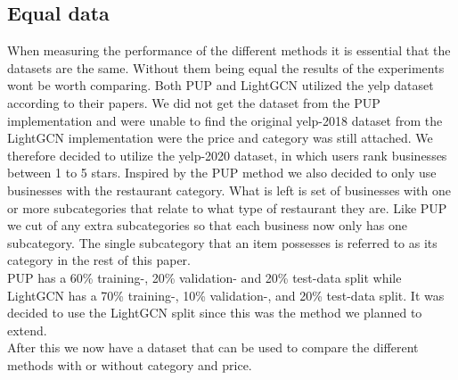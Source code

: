 \subsection{Equal data} \label{equal-data}
When measuring the performance of the different methods it is essential that the datasets are the same.
Without them being equal the results of the experiments wont be worth comparing.
Both PUP and LightGCN utilized the yelp dataset according to their papers.
We did not get the dataset from the PUP implementation and were unable to find the original yelp-2018 dataset from the LightGCN implementation were the price and category was still attached.
We therefore decided to utilize the yelp-2020 dataset, in which users rank businesses between 1 to 5 stars.
Inspired by the PUP method we also decided to only use businesses with the restaurant category.
What is left is set of businesses with one or more subcategories that relate to what type of restaurant they are.
Like PUP we cut of any extra subcategories so that each business now only has one subcategory.
The single subcategory that an item possesses is referred to as its category in the rest of this paper.
\\
PUP has a 60\% training-, 20\% validation- and 20\% test-data split while LightGCN has a 70\% training-, 10\% validation-, and 20\% test-data split.
It was decided to use the LightGCN split since this was the method we planned to extend.
\\
After this we now have a dataset that can be used to compare the different methods with or without category and price.
